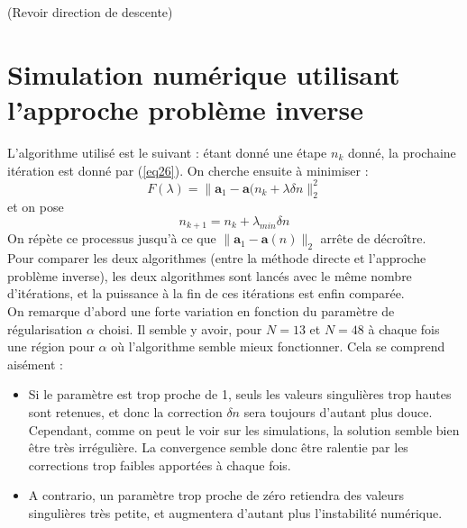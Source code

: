\documentclass{article}
\begin{document}
(Revoir direction de descente)

\section{Simulation numérique utilisant l'approche problème inverse}
L'algorithme utilisé est le suivant : étant donné une étape $n_k$ donné, la prochaine itération est donné par (\ref{eq26}). On cherche ensuite à minimiser :
	\[F(\lambda)=\|\mathbf{a}_1-\mathbf{a}(n_k+\lambda\delta n\|_2^2\]
et on pose
	\[n_{k+1}=n_k+\lambda_{min}\delta n\]
On répète ce processus jusqu'à ce que $\|\mathbf{a}_1-\mathbf{a}(n)\|_2$ arrête de décroître.\\
Pour comparer les deux algorithmes (entre la méthode directe et l'approche problème inverse), les deux algorithmes sont lancés avec le même nombre d'itérations, et la puissance à la fin de ces itérations est enfin comparée.\\
On remarque d'abord une forte variation en fonction du paramètre de régularisation $\alpha$ choisi. Il semble y avoir, pour $N=13$ et $N=48$ à chaque fois une région pour $\alpha$ où l'algorithme semble mieux fonctionner. Cela se comprend aisément :
\begin{itemize}
	\item Si le paramètre est trop proche de 1, seuls les valeurs singulières trop hautes sont retenues, et donc la correction $\delta n$ sera toujours d'autant plus douce. Cependant, comme on peut le voir sur les simulations, la solution semble bien être très irrégulière. La convergence semble donc être ralentie par les corrections trop faibles apportées à chaque fois.
	\item A contrario, un paramètre trop proche de zéro retiendra des valeurs singulières très petite, et augmentera d'autant plus l'instabilité numérique.
\end{itemize}
\end{document}
